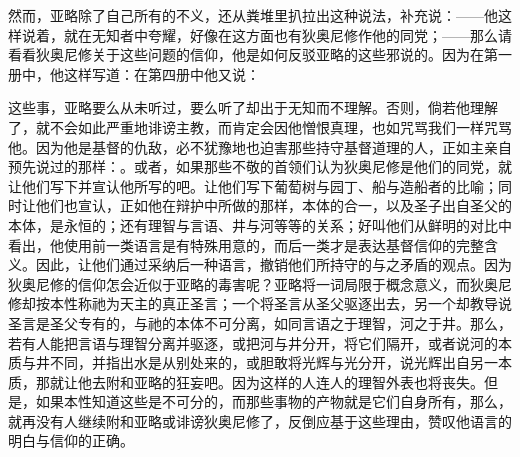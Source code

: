 然而，亚略除了自己所有的不义，还从粪堆里扒拉出这种说法，补充说：——他这样说着，就在无知者中夸耀，好像在这方面也有狄奥尼修作他的同党；——那么请看看狄奥尼修关于这些问题的信仰，他是如何反驳亚略的这些邪说的。因为在第一册中，他这样写道：在第四册中他又说：\par

\par

这些事，亚略要么从未听过，要么听了却出于无知而不理解。否则，倘若他理解了，就不会如此严重地诽谤主教，而肯定会因他憎恨真理，也如咒骂我们一样咒骂他。因为他是基督的仇敌，必不犹豫地也迫害那些持守基督道理的人，正如主亲自预先说过的那样：。或者，如果那些不敬的首领们认为狄奥尼修是他们的同党，就让他们写下并宣认他所写的吧。让他们写下葡萄树与园丁、船与造船者的比喻；同时让他们也宣认，正如他在辩护中所做的那样，本体的合一，以及圣子出自圣父的本体，是永恒的；还有理智与言语、井与河等等的关系；好叫他们从鲜明的对比中看出，他使用前一类语言是有特殊用意的，而后一类才是表达基督信仰的完整含义。因此，让他们通过采纳后一种语言，撤销他们所持守的与之矛盾的观点。因为狄奥尼修的信仰怎会近似于亚略的毒害呢？亚略将一词局限于概念意义，而狄奥尼修却按本性称祂为天主的真正圣言；一个将圣言从圣父驱逐出去，另一个却教导说圣言是圣父专有的，与祂的本体不可分离，如同言语之于理智，河之于井。那么，若有人能把言语与理智分离并驱逐，或把河与井分开，将它们隔开，或者说河的本质与井不同，并指出水是从别处来的，或胆敢将光辉与光分开，说光辉出自另一本质，那就让他去附和亚略的狂妄吧。因为这样的人连人的理智外表也将丧失。但是，如果本性知道这些是不可分的，而那些事物的产物就是它们自身所有，那么，就再没有人继续附和亚略或诽谤狄奥尼修了，反倒应基于这些理由，赞叹他语言的明白与信仰的正确。\par

